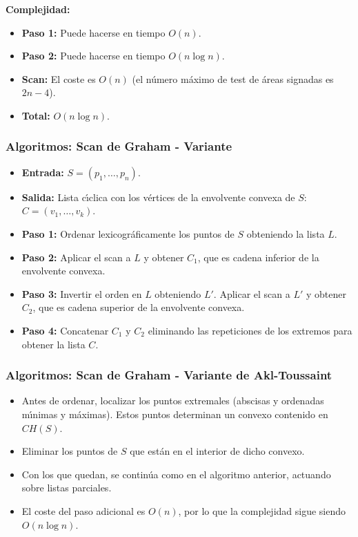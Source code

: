 \documentclass[twoside]{report}
\begin{document}
{\bf Complejidad:}

\begin{itemize}
  \item\textbf{Paso 1:} Puede hacerse en tiempo $O(n)$.
  \item\textbf{Paso 2:} Puede hacerse en tiempo $O(n\log n)$.
  \item\textbf{Scan:} El coste es $O(n)$ (el n\'{u}mero m\'{a}ximo de test de
\'{a}reas signadas es $2n-4$).
  \item\textbf{Total:} $O(n\log n)$.
\end{itemize}

\subsubsection{Algoritmos: Scan de Graham - Variante}

\begin{itemize}
  \item\textbf{Entrada:} $S=(p_1,\dots,p_n)$.
  \item\textbf{Salida:} Lista c\'{\i}clica con los v\'{e}rtices de la envolvente
convexa de $S$: $C=(v_1,\dots,v_k)$.
  \item\textbf{Paso 1:} Ordenar lexicogr\'{a}ficamente los puntos de $S$
obteniendo la lista $L$.
  \item\textbf{Paso 2:} Aplicar el scan a $L$ y obtener $C_1$, que es
cadena inferior de la envolvente convexa.
  \item\textbf{Paso 3:} Invertir el orden en $L$ obteniendo $L'$. Aplicar
el scan a $L'$ y obtener $C_2$, que es cadena superior de la
envolvente convexa.
  \item\textbf{Paso 4:} Concatenar $C_1$ y $C_2$ eliminando las
repeticiones de los extremos para obtener la lista $C$.
\end{itemize}

\subsubsection{Algoritmos: Scan de Graham - Variante de Akl-Toussaint}

\begin{itemize}
  \item Antes de ordenar, localizar los puntos extremales (abscisas
y ordenadas m\'{\i}nimas y m\'{a}ximas). Estos puntos determinan un convexo
contenido en $CH(S)$.
  \item Eliminar los puntos de $S$ que est\'{a}n en el interior de dicho
convexo.
  \item Con los que quedan, se contin\'{u}a como en el algoritmo
anterior, actuando sobre listas parciales.
  \item El coste del paso adicional es $O(n)$, por lo que la
complejidad sigue siendo $O(n\log n)$.
\end{itemize}
\end{document}
